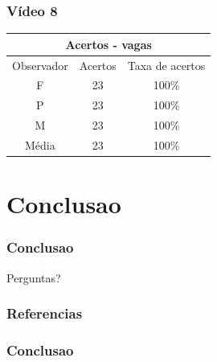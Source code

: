 \documentclass{beamer}
\begin{document}
\begin{frame}
\frametitle{Vídeo 8}

\begin{center}
\begin{tabular}{|c||c||c|}
\hline
\multicolumn{3}{|c|}{Acertos - vagas}  \\ \hline \hline
Observador & Acertos & Taxa de acertos \\ \hline
F & 23 & 100\% \\  \hline
P & 23 & 100\% \\ \hline
M & 23 & 100\% \\ \hline
Média & 23 & 100\% \\
\hline
\end{tabular}
\end{center}
\end{frame}




\section{Conclusao}
\begin{frame}
\frametitle{Conclusao}
\huge
Perguntas?

\end{frame}


\begin{frame}[allowframebreaks]
\frametitle{Referencias}



\end{frame}




\begin{frame}
\frametitle{Conclusao}
\huge
\cite{bong2008integrated} \cite{chen2012dynamic} \cite{de2006introduccao} \cite{delibaltov2013parking}\cite{gonzalez2009digital}
\cite{graciano2007rastreamento} \cite{hai2009self} \cite{IBGE2000introducao} \cite{idris09} \cite{marques1999processamento}
\cite{true2007vacant} \cite{vkl1989jain}
\end{frame}


\end{document}
